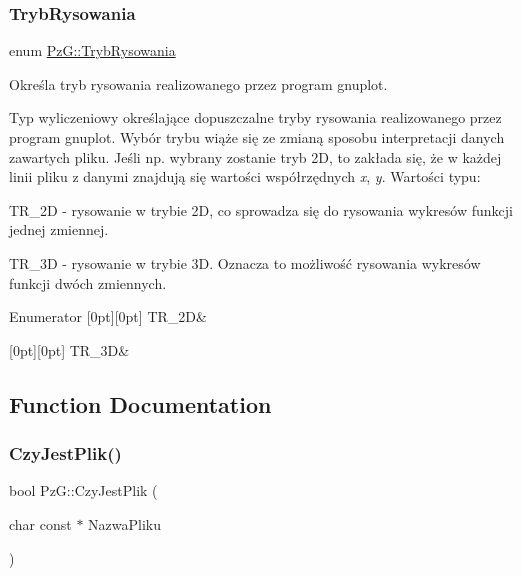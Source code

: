 \subsubsection{\texorpdfstring{Tryb\+Rysowania}{TrybRysowania}}
{\footnotesize\ttfamily enum \hyperlink{namespacePzG_aeedae1ef10c66d720f9e89de408ca4ca}{Pz\+G\+::\+Tryb\+Rysowania}}



Określa tryb rysowania realizowanego przez program {\ttfamily gnuplot}. 

Typ wyliczeniowy określające dopuszczalne tryby rysowania realizowanego przez program {\ttfamily gnuplot}. Wybór trybu wiąże się ze zmianą sposobu interpretacji danych zawartych pliku. Jeśli np. wybrany zostanie tryb 2D, to zakłada się, że w każdej linii pliku z danymi znajdują się wartości współrzędnych {\itshape x}, {\itshape y}. Wartości typu\+: \begin{DoxyItemize}
\item {\ttfamily T\+R\+\_\+2D} -\/ rysowanie w trybie 2D, co sprowadza się do rysowania wykresów funkcji jednej zmiennej. \item {\ttfamily T\+R\+\_\+3D} -\/ rysowanie w trybie 3D. Oznacza to możliwość rysowania wykresów funkcji dwóch zmiennych. \end{DoxyItemize}
\begin{DoxyEnumFields}{Enumerator}
[0pt][0pt]{}\mbox{\label{namespacePzG_aeedae1ef10c66d720f9e89de408ca4caa5eb0cf8b3405e136f092efdb489d60c4}} 
T\+R\+\_\+2D&\\
\hline

[0pt][0pt]{}\mbox{\label{namespacePzG_aeedae1ef10c66d720f9e89de408ca4caa856e6b0fa6b8a9dc184c60cf27dcc5d2}} 
T\+R\+\_\+3D&\\
\hline

\end{DoxyEnumFields}


\subsection{Function Documentation}
\mbox{\label{namespacePzG_ae1ae4d36f66c77879380ba73da8e20e3}} 
\subsubsection{\texorpdfstring{Czy\+Jest\+Plik()}{CzyJestPlik()}}
{\footnotesize\ttfamily bool Pz\+G\+::\+Czy\+Jest\+Plik (\begin{DoxyParamCaption}\item[{char const $\ast$}]{Nazwa\+Pliku }\end{DoxyParamCaption})}


